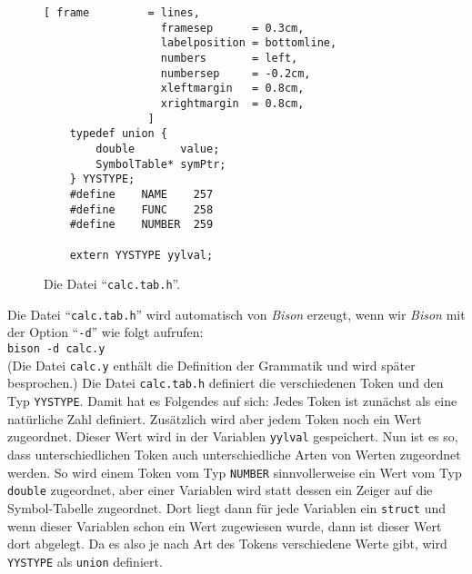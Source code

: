\begin{figure}[!ht]
\centering
\begin{Verbatim}[ frame         = lines, 
                  framesep      = 0.3cm, 
                  labelposition = bottomline,
                  numbers       = left,
                  numbersep     = -0.2cm,
                  xleftmargin   = 0.8cm,
                  xrightmargin  = 0.8cm,
                ]
    typedef union {
        double       value;
        SymbolTable* symPtr;
    } YYSTYPE;
    #define    NAME    257
    #define    FUNC    258
    #define    NUMBER  259
    
    extern YYSTYPE yylval;
\end{Verbatim}
\vspace*{-0.3cm}
\caption{Die Datei ``\texttt{calc.tab.h}''.}
\label{fig:calc.tab.h}
\end{figure}
Die Datei ``\texttt{calc.tab.h}'' wird automatisch von \textsl{Bison} erzeugt,
wenn wir \textsl{Bison} mit der Option ``\texttt{-d}'' wie folgt aufrufen:
\\[0.2cm]
\hspace*{1.3cm}
\texttt{bison -d calc.y}
\\[0.2cm]
(Die Datei \texttt{calc.y} enth\"alt die Definition der Grammatik und wird sp\"ater besprochen.)
Die Datei \texttt{calc.tab.h} definiert die verschiedenen Token und den Typ
\texttt{YYSTYPE}.  Damit hat es Folgendes auf sich: Jedes Token ist zun\"achst als eine
nat\"urliche Zahl definiert.  Zus\"atzlich wird aber jedem Token noch ein Wert zugeordnet.
Dieser Wert wird in der Variablen \texttt{yylval} gespeichert.  Nun ist es so, dass
unterschiedlichen Token auch unterschiedliche Arten von Werten zugeordnet werden.  So wird
einem Token vom Typ \texttt{NUMBER} sinnvollerweise ein Wert vom Typ \texttt{double}
zugeordnet, aber einer Variablen wird statt dessen ein Zeiger auf die Symbol-Tabelle
zugeordnet.  Dort liegt dann f\"ur jede Variablen ein \texttt{struct} und wenn dieser
Variablen schon ein Wert zugewiesen wurde, dann ist dieser Wert dort abgelegt.  Da es also
je nach Art des Tokens verschiedene Werte gibt, wird \texttt{YYSTYPE} als \texttt{union}
definiert.

